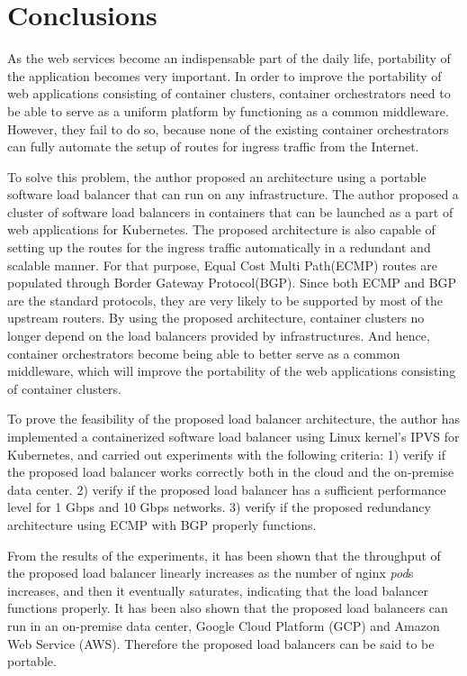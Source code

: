 \section{Conclusions}\label{Conclusions}

As the web services become an indispensable part of the daily life, portability of the application becomes very important.
%
In order to improve the portability of web applications consisting of container clusters, container orchestrators need to be able to serve as a uniform platform by functioning as a common middleware.
However, they fail to do so, because none of the existing container orchestrators can fully automate the setup of routes for ingress traffic from the Internet.



To solve this problem, the author proposed an architecture using a portable software load balancer that can run on any infrastructure.
The author proposed a cluster of software load balancers in containers that can be launched as a part of web applications for Kubernetes.
%
The proposed architecture is also capable of setting up the routes for the ingress traffic automatically in a redundant and scalable manner.
  For that purpose, Equal Cost Multi Path(ECMP) routes are populated through Border Gateway Protocol(BGP).
  Since both ECMP and BGP are the standard protocols, they are very likely to be supported by most of the upstream routers.
  By using the proposed architecture, container clusters no longer depend on the load balancers provided by infrastructures.
  And hence, container orchestrators become being able to better serve as a common middleware, which will improve the portability of the web applications consisting of container clusters.

To prove the feasibility of the proposed load balancer architecture, the author has implemented a containerized software load balancer using Linux kernel's IPVS for Kubernetes, and carried out experiments with the following criteria:
  1) verify if the proposed load balancer works correctly both in the cloud and the on-premise data center.
  2) verify if the proposed load balancer has a sufficient performance level for 1 Gbps and 10 Gbps networks.
  3) verify if the proposed redundancy architecture using ECMP with BGP properly functions.

From the results of the experiments, it has been shown that the 
throughput of the proposed load balancer linearly increases as the number of nginx {\em pod}s increases, and then it eventually saturates, indicating that the load balancer functions properly.
It has been also shown that the proposed load balancers can run in an on-premise data center, Google Cloud Platform (GCP) and Amazon Web Service (AWS).
Therefore the proposed load balancers can be said to be portable.

